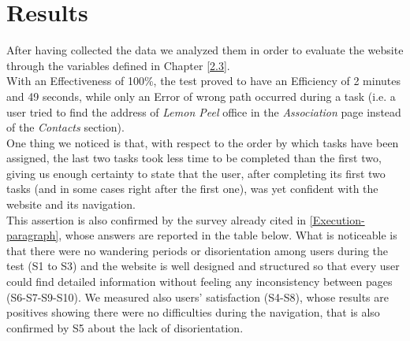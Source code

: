 \documentclass[../../UsabilityReport.tex]{subfiles}
\begin{document}
\section{Results}
	After having collected the data we analyzed them in order to evaluate the website through the variables defined in Chapter \ref{2.3}. \\
	
	With an Effectiveness of 100\%, the test proved to have an Efficiency of 2 minutes and 49 seconds, while only an Error of wrong path occurred during a task (i.e. a user tried to find the address of \textit{Lemon Peel} office in the \textit{Association} page instead of the \textit{Contacts} section). \\
	
	One thing we noticed is that, with respect to the order by which tasks have been assigned, the last two tasks took less time to be completed than the first two, giving us enough certainty to state that the user, after completing its first two tasks (and in some cases right after the first one), was yet confident with the website and its navigation. \\
	This assertion is also confirmed by the survey already cited in \ref{Execution-paragraph}, whose answers are reported in the table below. What is noticeable is that there were no wandering periods or disorientation among users during the test (S1 to S3)  and the website is well designed and structured so that every user could find detailed information without feeling any inconsistency between pages (S6-S7-S9-S10). We measured also users' satisfaction (S4-S8), whose results are positives showing there were no difficulties during the navigation, that is also confirmed by S5 about the lack of disorientation.
	
\end{document}
